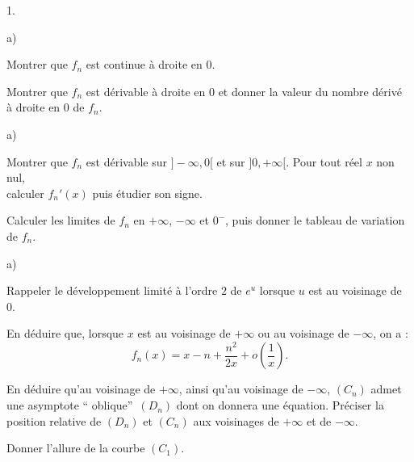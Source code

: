 \documentclass[11pt]{article}%
\begin{document}
\begin{noliste}{1.}
 \setlength{\itemsep}{4mm}
\item 

\begin{noliste}{a)}
 \setlength{\itemsep}{2mm}
\item Montrer que $f_{n}$ est continue à droite en 0.

\item Montrer que $f_{n}$ est dérivable à droite en 0 et donner la
valeur du
nombre dérivé \\
à droite en 0 de $f_{n}$.
\end{noliste}

\item 

\begin{noliste}{a)}
 \setlength{\itemsep}{2mm}
\item Montrer que $f_{n}$ est dérivable sur $]-\infty,0[$ et sur $
]0, + \infty \lbrack $. Pour tout réel $x$ non nul, \\
calculer $f_{n}{\prime }(x)$ puis étudier son signe.

\item Calculer les limites de $f_{n}$ en $ + \infty $, $-\infty $ et
$0^{-}$,
puis donner le tableau de variation de $f_{n}$.
\end{noliste}

\item 

\begin{noliste}{a)}
 \setlength{\itemsep}{2mm}
\item Rappeler le développement limité à l'ordre $2$ de $e^{u}$ lorsque
$u$
est au voisinage de 0.

\item En déduire que, lorsque $x$ est au voisinage de $ + \infty $ ou
au
voisinage de $-\infty $, on a :
\[
f_{n}(x) = x-n + \dfrac{n^{2}}{2x} + o(\dfrac{1}{x}).
\]

\item En déduire qu'au voisinage de $ + \infty $, ainsi qu'au voisinage
de $
-\infty $, $(C_{n})$ admet une asymptote \textquotedblleft
oblique\textquotedblright\ $(D_{n})$ dont on donnera une équation.
Préciser
la position relative de $(D_{n})$ et $(C_{n})$ aux voisinages de $ +
\infty $
et de $-\infty $.

\item Donner l'allure de la courbe $(C_{1})$.
\end{noliste}

\item 


\end{noliste}
\end{document}
